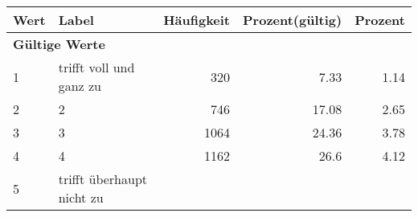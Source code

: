      \begin{longtable}{lXrrr}
     \toprule
     \textbf{Wert} & \textbf{Label} & \textbf{Häufigkeit} & \textbf{Prozent(gültig)} & \textbf{Prozent} \\
     \endhead
     \midrule
     \multicolumn{5}{l}{\textbf{Gültige Werte}}\\

     1 &
     \multicolumn{1}{X}{ trifft voll und ganz zu   } &


       \num{320} &
       \num[round-mode=places,round-precision=2]{7.33} &
         \num[round-mode=places,round-precision=2]{1.14} \\

     2 &
     \multicolumn{1}{X}{ 2   } &


       \num{746} &
       \num[round-mode=places,round-precision=2]{17.08} &
         \num[round-mode=places,round-precision=2]{2.65} \\

     3 &
     \multicolumn{1}{X}{ 3   } &


       \num{1064} &
       \num[round-mode=places,round-precision=2]{24.36} &
         \num[round-mode=places,round-precision=2]{3.78} \\

     4 &
     \multicolumn{1}{X}{ 4   } &


       \num{1162} &
       \num[round-mode=places,round-precision=2]{26.6} &
         \num[round-mode=places,round-precision=2]{4.12} \\

     5 &
     \multicolumn{1}{X}{ trifft überhaupt nicht zu   } &



\end{longtable}

